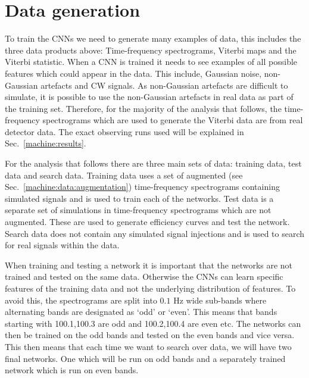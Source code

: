 \section{\label{machine:data} Data generation}

%

To train the \glspl{CNN} we need to generate many examples of data, this includes the three data products above: Time-frequency spectrograms, Viterbi maps and the Viterbi statistic. 
When a \gls{CNN} is trained it needs to see examples of all possible features which could appear in the data. This include, Gaussian noise, non-Gaussian artefacts and \gls{CW} signals. 
As non-Gaussian artefacts are difficult to simulate, it is possible to use the non-Gaussian artefacts in real data as part of the training set.
Therefore, for the majority of the analysis that follows, the time-frequency spectrograms which are used to generate the Viterbi data are from real detector data. The exact observing runs used will be explained in Sec.~\ref{machine:results}. 

For the analysis that follows there are three main sets of data: training data,
test data and search data. 
Training data uses a set of augmented (see Sec.~\ref{machine:data:augmentation}) time-frequency spectrograms containing simulated signals and is used to train each of
the networks. 
Test data is a separate set of simulations in time-frequency spectrograms which are not augmented. These are used to generate
efficiency curves and test the network.
Search data does not contain any simulated signal injections and is used to search for real signals within the data.

%
When training and testing a network it is important that the networks are not
trained and tested on the same data. Otherwise the \glspl{CNN} can learn specific
features of the training data and not the underlying
distribution of features. To avoid this, the spectrograms are split into $0.1$
Hz wide sub-bands where alternating bands are designated as `odd' or `even'.
This means that bands starting with 100.1,100.3 are odd and 100.2,100.4 are
even etc. The networks can then be trained on the odd bands and tested on the
even bands and vice versa.
This then means that each time we want to search over data, we will have two final networks. One which will be run on odd bands and a separately trained network which is run on even bands. 



